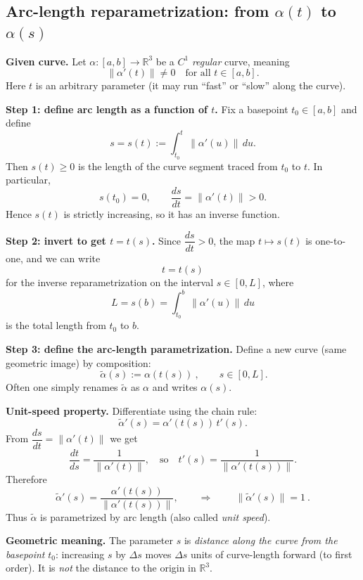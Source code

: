 \documentclass[12pt,a4paper]{article}
\theoremstyle{plain}
\theoremstyle{definition}      %
\begin{document}
	\subsection*{Arc-length reparametrization: from $\alpha(t)$ to $\alpha(s)$}
	
	\noindent\textbf{Given curve.}
	Let $\alpha:[a,b]\to\mathbb{R}^3$ be a $C^1$ \emph{regular} curve, meaning
	\[
	\|\alpha'(t)\|\neq 0 \quad \text{for all } t\in[a,b].
	\]
	Here $t$ is an arbitrary parameter (it may run ``fast'' or ``slow'' along the curve).
	
	\medskip
	\noindent\textbf{Step 1: define arc length as a function of $t$.}
	Fix a basepoint $t_0\in[a,b]$ and define
	\[
	s=s(t):=\int_{t_0}^{t}\|\alpha'(u)\|\,du.
	\]
	Then $s(t)\ge 0$ is the length of the curve segment traced from $t_0$ to $t$.
	In particular,
	\[
	s(t_0)=0,
	\qquad
	\frac{ds}{dt}=\|\alpha'(t)\|>0.
	\]
	Hence $s(t)$ is strictly increasing, so it has an inverse function.
	
	\medskip
	\noindent\textbf{Step 2: invert to get $t=t(s)$.}
	Since $\dfrac{ds}{dt}>0$, the map $t\mapsto s(t)$ is one-to-one, and we can write
	\[
	t=t(s)
	\]
	for the inverse reparametrization on the interval $s\in[0,L]$, where
	\[
	L=s(b)=\int_{t_0}^{b}\|\alpha'(u)\|\,du
	\]
	is the total length from $t_0$ to $b$.
	
	\medskip
	\noindent\textbf{Step 3: define the arc-length parametrization.}
	Define a new curve (same geometric image) by composition:
	\[
	\boxed{\ \widetilde\alpha(s):=\alpha(t(s))\ },\qquad s\in[0,L].
	\]
	Often one simply renames $\widetilde\alpha$ as $\alpha$ and writes $\alpha(s)$.
	
	\medskip
	\noindent\textbf{Unit-speed property.}
	Differentiate using the chain rule:
	\[
	\widetilde\alpha'(s)=\alpha'(t(s))\,t'(s).
	\]
	From $\dfrac{ds}{dt}=\|\alpha'(t)\|$ we get
	\[
	\frac{dt}{ds}=\frac{1}{\|\alpha'(t)\|},
	\quad\text{so}\quad
	t'(s)=\frac{1}{\|\alpha'(t(s))\|}.
	\]
	Therefore
	\[
	\widetilde\alpha'(s)
	=\frac{\alpha'(t(s))}{\|\alpha'(t(s))\|},
	\qquad\Rightarrow\qquad
	\boxed{\ \|\widetilde\alpha'(s)\|=1\ }.
	\]
	Thus $\widetilde\alpha$ is parametrized by arc length (also called \emph{unit speed}).
	
	\medskip
	\noindent\textbf{Geometric meaning.}
	The parameter $s$ is \emph{distance along the curve from the basepoint} $t_0$:
	increasing $s$ by $\Delta s$ moves $\Delta s$ units of curve-length forward (to first order).
	It is \emph{not} the distance to the origin in $\mathbb{R}^3$.
	
\end{document}
